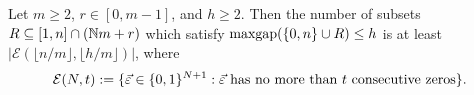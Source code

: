 





\begin{lemma} \label{lem:concentration to tuples}
Let $m\ge 2$, $r\in [0,m-1]$, and $h\ge 2$.
Then the number of subsets $R\subseteq [1,n]\cap (\mathbb{N} m +r)$ which satisfy $\operatorname{maxgap}(\{0,n\}\cup R) \le h$ is at least $|\mathcal{E}(\lfloor n/m \rfloor,\lfloor h/m \rfloor)|$, where
\[ \mathcal{E}(N,t) := \{ \vec{\varepsilon}\in \{0,1\}^{N+1}: \vec{\varepsilon} \textrm{ has no more than $t$ consecutive zeros}\}. \]
\end{lemma}
